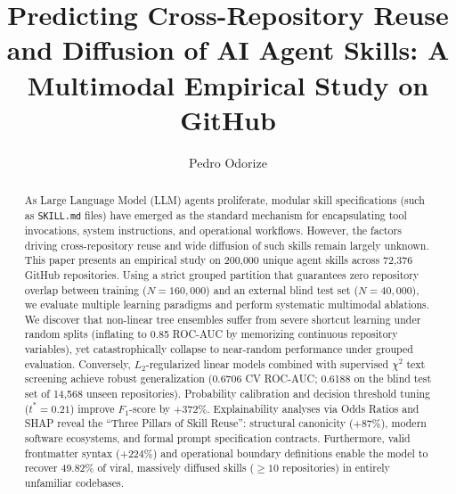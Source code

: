 \documentclass[12pt]{article}
\title{Predicting Cross-Repository Reuse and Diffusion of AI Agent Skills: A Multimodal Empirical Study on GitHub}
\author{Pedro Odorize\inst{1}}
\begin{document}
\maketitle

\begin{abstract}
As Large Language Model (LLM) agents proliferate, modular skill specifications (such as \texttt{SKILL.md} files) have emerged as the standard mechanism for encapsulating tool invocations, system instructions, and operational workflows. However, the factors driving cross-repository reuse and wide diffusion of such skills remain largely unknown. This paper presents an empirical study on 200,000 unique agent skills across 72,376 GitHub repositories. Using a strict grouped partition that guarantees zero repository overlap between training ($N=160,000$) and an external blind test set ($N=40,000$), we evaluate multiple learning paradigms and perform systematic multimodal ablations. We discover that non-linear tree ensembles suffer from severe shortcut learning under random splits (inflating to 0.85 ROC-AUC by memorizing continuous repository variables), yet catastrophically collapse to near-random performance under grouped evaluation. Conversely, $L_2$-regularized linear models combined with supervised $\chi^2$ text screening achieve robust generalization (0.6706 CV ROC-AUC; 0.6188 on the blind test set of 14,568 unseen repositories). Probability calibration and decision threshold tuning ($t^*=0.21$) improve $F_1$-score by $+372\%$. Explainability analyses via Odds Ratios and SHAP reveal the ``Three Pillars of Skill Reuse'': structural canonicity ($+87\%$), modern software ecosystems, and formal prompt specification contracts. Furthermore, valid frontmatter syntax ($+224\%$) and operational boundary definitions enable the model to recover 49.82\% of viral, massively diffused skills ($\ge 10$ repositories) in entirely unfamiliar codebases.
\end{abstract}
\end{document}
